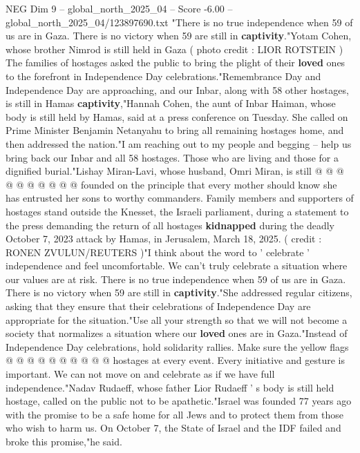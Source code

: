 \begin{textsample}{NEG Dim 9 – global\_north\_2025\_04 – Score -6.00 – global\_north\_2025\_04/123897690.txt}  \label{ex:f9_neg_128}
"There is no true independence when 59 of us are in Gaza.
There is no victory when 59 are still in \textbf{captivity}."Yotam Cohen, whose brother Nimrod is still held in Gaza ( photo credit : LIOR ROTSTEIN ) The families of hostages asked the public to bring the plight of their \textbf{loved} ones to the forefront in Independence Day celebrations."Remembrance Day and Independence Day are approaching, and our Inbar, along with 58 other hostages, is still in Hamas \textbf{captivity},"Hannah Cohen, the aunt of Inbar Haiman, whose body is still held by Hamas, said at a press conference on Tuesday.
She called on Prime Minister Benjamin Netanyahu to bring all remaining hostages home, and then addressed the nation."I am reaching out to my people and begging -- help us bring back our Inbar and all 58 hostages.
Those who are living and those for a dignified burial."Lishay Miran-Lavi, whose husband, Omri Miran, is still @ @ @ @ @ @ @ @ @ @ founded on the principle that every mother should know she has entrusted her sons to worthy commanders.
Family members and supporters of hostages stand outside the Knesset, the Israeli parliament, during a statement to the press demanding the return of all hostages \textbf{kidnapped} during the deadly October 7, 2023 attack by Hamas, in Jerusalem, March 18, 2025. ( credit : RONEN ZVULUN/REUTERS )"I think about the word to ' celebrate ' independence and feel uncomfortable.
We can't truly celebrate a situation where our values are at risk.
There is no true independence when 59 of us are in Gaza.
There is no victory when 59 are still in \textbf{captivity}."She addressed regular citizens, asking that they ensure that their celebrations of Independence Day are appropriate for the situation."Use all your strength so that we will not become a society that normalizes a situation where our \textbf{loved} ones are in Gaza."Instead of Independence Day celebrations, hold solidarity rallies.
Make sure the yellow flags @ @ @ @ @ @ @ @ @ @ hostages at every event.
Every initiative and gesture is important.
We can not move on and celebrate as if we have full independence."Nadav Rudaeff, whose father Lior Rudaeff ' s body is still held hostage, called on the public not to be apathetic."Israel was founded 77 years ago with the promise to be a safe home for all Jews and to protect them from those who wish to harm us.
On October 7, the State of Israel and the IDF failed and broke this promise,"he said.

\end{textsample}

